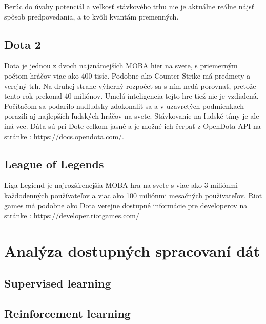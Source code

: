 Berúc do úvahy potenciál a veľkosť stávkového trhu nie je aktuálne reálne nájsť spôsob predpovedania, a to kvôli kvantám premenných.

\subsection{Dota 2}
Dota je jednou z dvoch najznámejších MOBA hier na svete, s priemerným počtom hráčov viac ako 400 tisíc. Podobne ako Counter-Strike má predmety a verejný trh. Na druhej strane výherný rozpočet sa s ním nedá porovnať, pretože tento rok prekonal 40 miliónov. Umelá inteligencia tejto hre tiež nie je vzdialená. Počítačom sa podarilo nadľudsky zdokonaliť sa a v uzavretých podmienkach porazili aj najlepších ľudských hráčov na svete. Stávkovanie na ľudské tímy je ale iná vec. Dáta sú pri Dote celkom jasné a je možné ich čerpať z OpenDota API na stránke : https://docs.opendota.com/.

\subsection{League of Legends}
Liga Legiend je najrozšírenejšia MOBA hra na svete s viac ako 3 miliónmi každodenných používateľov a viac ako 100 miliónmi mesačných použivateľov. Riot games má podobne ako Dota verejne dostupné informácie pre developerov na stránke : https://developer.riotgames.com/ 

\section{Analýza dostupných spracovaní dát}
\subsection{Supervised learning}
\subsection{Reinforcement learning}
